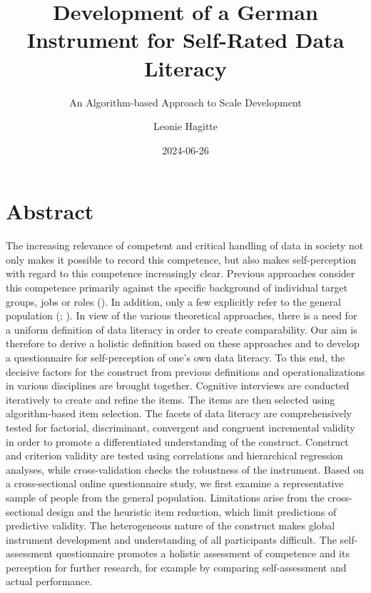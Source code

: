 \documentclass[
  12pt,
  a4paper,
  twoside]{article}
\title{Development of a German Instrument for Self-Rated Data Literacy}
\subtitle{An Algorithm-based Approach to Scale Development}
\author{Leonie Hagitte}
\date{2024-06-26}
\begin{document}
\maketitle

{
\setcounter{tocdepth}{2}
\tableofcontents
}
\newpage\null\thispagestyle{empty}\newpage

\section*{Abstract}\label{abstract}

The increasing relevance of competent and critical handling of data in society not only makes it possible to record this competence, but also makes self-perception with regard to this competence increasingly clear. Previous approaches consider this competence primarily against the specific background of individual target groups, jobs or roles (). In addition, only a few explicitly refer to the general population (; ). In view of the various theoretical approaches, there is a need for a uniform definition of data literacy in order to create comparability.
Our aim is therefore to derive a holistic definition based on these approaches and to develop a questionnaire for self-perception of one's own data literacy. To this end, the decisive factors for the construct from previous definitions and operationalizations in various disciplines are brought together. Cognitive interviews are conducted iteratively to create and refine the items. The items are then selected using algorithm-based item selection. The facets of data literacy are comprehensively tested for factorial, discriminant, convergent and congruent incremental validity in order to promote a differentiated understanding of the construct. Construct and criterion validity are tested using correlations and hierarchical regression analyses, while cross-validation checks the robustness of the instrument.
Based on a cross-sectional online questionnaire study, we first examine a representative sample of people from the general population. Limitations arise from the cross-sectional design and the heuristic item reduction, which limit predictions of predictive validity. The heterogeneous nature of the construct makes global instrument development and understanding of all participants difficult.
The self-assessment questionnaire promotes a holistic assessment of competence and its perception for further research, for example by comparing self-assessment and actual performance.
\end{document}
